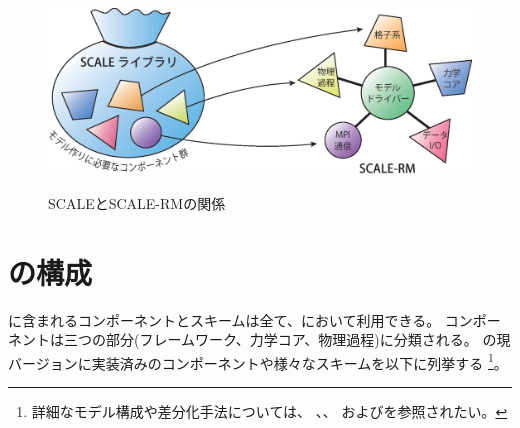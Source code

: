 \begin{figure}[hbt]
\begin{center}
  \includegraphics[width=0.9\hsize]{./figure/scale.eps}\\
  \caption{SCALEとSCALE-RMの関係}
  \label{fig:scale-rm}
\end{center}
\end{figure}



\section{\scalerm の構成}  \label{subsec:sturcture_scale_rm}
\scalelib に含まれるコンポーネントとスキームは全て、\scalerm において利用できる。
コンポーネントは三つの部分(フレームワーク、力学コア、物理過程)に分類される。
\scalerm の現バージョンに実装済みのコンポーネントや様々なスキームを以下に列挙する%
\footnote{
詳細なモデル構成や差分化手法については、
\citet{scale_2015}、\citet{satoy_2015b}、
および\citet{nishizawa_2015}を参照されたい。
}。
\\

